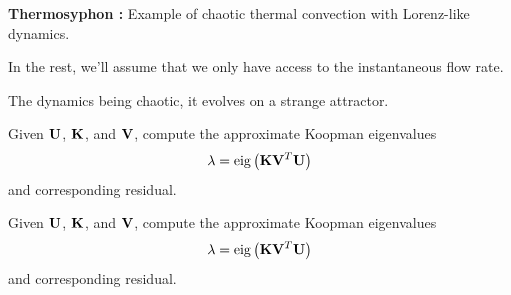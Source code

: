 \documentclass[aspectratio=169, usenames, dvipsnames]{beamer}
\begin{document}
\begin{frame}
  \vfill
  \centering
  
  \vfill
\end{frame}

\begin{frame}
  \vfill
  \begin{minipage}{.28\textwidth}
    \centering
  \end{minipage}%
  \hfill
  \begin{minipage}{.68\textwidth}
    \textbf{Thermosyphon :} Example of chaotic thermal convection with Lorenz-like dynamics.

    \bigskip

    In the rest, we'll assume that we only have access to the instantaneous flow rate.
  \end{minipage}
  \vfill
\end{frame}

\begin{frame}
  \vfill
  \begin{minipage}{.48\textwidth}
    The dynamics being chaotic, it evolves on a strange attractor.
  \end{minipage}%
  \hfill
  \begin{minipage}{.48\textwidth}
    \centering
  \end{minipage}
  \vfill
\end{frame}

\begin{frame}
  \vfill
  \begin{minipage}{.48\textwidth}
    Given $\vb{U}$, $\vb{K}$, and $\vb{V}$, compute the approximate Koopman eigenvalues
    \[
      \lambda = \mathrm{eig}\left( \vb{K} \vb{V}^T \vb{U} \right)
    \]
    and corresponding residual.
  \end{minipage}%
  \hfill
  \begin{minipage}{.48\textwidth}
    \centering
  \end{minipage}

  \vfill
\end{frame}


\begin{frame}
  \vfill
  \begin{minipage}{.48\textwidth}
    Given $\vb{U}$, $\vb{K}$, and $\vb{V}$, compute the approximate Koopman eigenvalues
    \[
      \lambda = \mathrm{eig}\left( \vb{K} \vb{V}^T \vb{U} \right)
    \]
    and corresponding residual.
  \end{minipage}%
  \hfill
  \begin{minipage}{.48\textwidth}
    \centering
  \end{minipage}

  \vfill
\end{frame}
\end{document}
